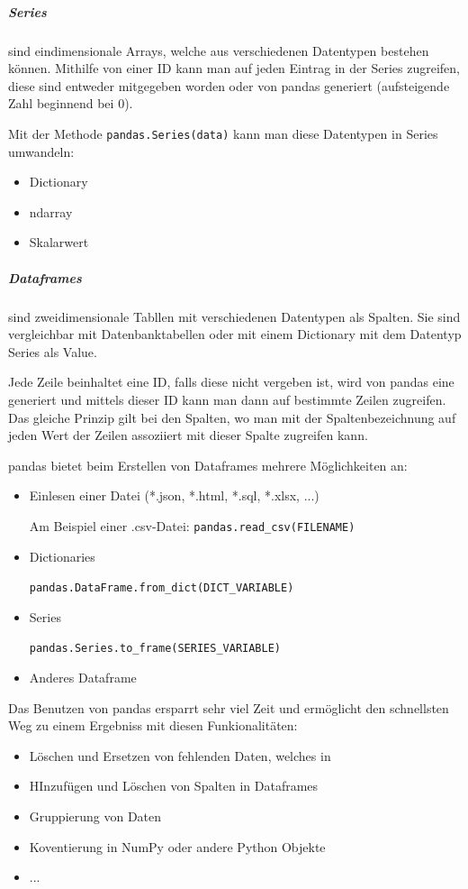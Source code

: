 \subparagraph{Series} sind eindimensionale Arrays, welche aus verschiedenen Datentypen bestehen können. Mithilfe von einer ID kann man auf jeden Eintrag in der Series zugreifen, diese sind entweder mitgegeben worden oder von pandas generiert (aufsteigende Zahl beginnend bei 0).

Mit der Methode \lstinline!pandas.Series(data)! kann man diese Datentypen in Series umwandeln:

\begin{itemize}
    \item Dictionary
    \item ndarray
    \item Skalarwert
\end{itemize}

\subparagraph{Dataframes} sind zweidimensionale Tabllen mit verschiedenen Datentypen als Spalten. Sie sind vergleichbar mit Datenbanktabellen oder mit einem Dictionary mit dem Datentyp Series als Value.

Jede Zeile beinhaltet eine ID, falls diese nicht vergeben ist, wird von pandas eine generiert und mittels dieser ID kann man dann auf bestimmte Zeilen zugreifen. Das gleiche Prinzip gilt bei den Spalten, wo man mit der Spaltenbezeichnung auf jeden Wert der Zeilen assoziiert mit dieser Spalte zugreifen kann.

pandas bietet beim Erstellen von Dataframes mehrere Möglichkeiten an:

\begin{itemize}
    \item Einlesen einer Datei (*.json, *.html, *.sql, *.xlsx, ...)

          Am Beispiel einer .csv-Datei: \lstinline!pandas.read_csv(FILENAME)!
    \item Dictionaries

          \lstinline!pandas.DataFrame.from_dict(DICT_VARIABLE)!
    \item Series

          \lstinline!pandas.Series.to_frame(SERIES_VARIABLE)!
    \item Anderes Dataframe
\end{itemize}

Das Benutzen von pandas ersparrt sehr viel Zeit und ermöglicht den schnellsten Weg zu einem Ergebniss mit diesen Funkionalitäten:

\begin{itemize}
    \item Löschen und Ersetzen von fehlenden Daten, welches in %
    \item HInzufügen und Löschen von Spalten in Dataframes
    \item Gruppierung von Daten
    \item Koventierung in NumPy oder andere Python Objekte
    \item ...
\end{itemize}

